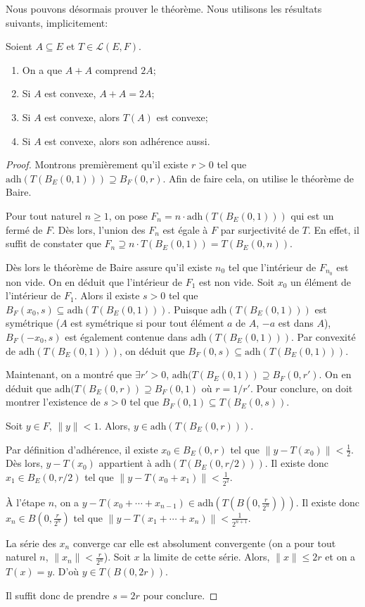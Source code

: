 Nous pouvons désormais prouver le théorème. Nous utilisons les résultats
suivants, implicitement:
\begin{exo}
  Soient $A\subseteq E$ et $T\in\mathscr{L}(E, F)$.
  \begin{enumerate}
  \item On a que $A + A$ comprend $2A$;
  \item Si $A$ est convexe, $A+A = 2A$;
  \item Si $A$ est convexe, alors $T(A)$ est convexe;
  \item Si $A$ est convexe, alors son adhérence aussi.
  \end{enumerate}
\end{exo}
\begin{proof}
  Montrons premièrement qu'il existe $r>0$ tel que $\mathrm{adh}(T(B_E(0, 1)))%
  \supseteq B_F(0, r)$. Afin de faire cela, on utilise le théorème de Baire.

  Pour tout naturel $n\geq 1$, on pose $F_n = n\cdot\mathrm{adh}(T(B_E(0, 1)))$
  qui est un fermé de $F$. Dès lors, l'union des $F_n$ est égale à $F$
  par surjectivité de $T$. En effet, il suffit de constater que
  $F_n\supseteq n\cdot T(B_E(0, 1)) =T(B_E(0, n))$.

  Dès lors le théorème de Baire assure qu'il existe $n_0$ tel que
  l'intérieur de $F_{n_0}$ est non vide. On en déduit que l'intérieur
  de $F_1$ est non vide. Soit $x_0$ un élément de l'intérieur de $F_1$.
  Alors il existe $s>0$ tel que
  $B_F(x_0, s)\subseteq  \mathrm{adh}(T(B_E(0, 1)))$. Puisque
  $\mathrm{adh}(T(B_E(0, 1)))$ est symétrique ($A$ est symétrique
  si pour tout élément $a$ de $A$, $-a$ est dans $A$), $B_F(-x_0, s)$
  est également contenue dans $\mathrm{adh}(T(B_E(0, 1)))$. Par convexité
  de $\mathrm{adh}(T(B_E(0, 1)))$, on déduit que
  $B_F(0, s)\subseteq \mathrm{adh}(T(B_E(0, 1)))$.

  Maintenant, on a montré que $\exists r' > 0$, $\mathrm{adh}(T(B_E(0, 1))%
  \supseteq B_F(0, r')$. On en déduit que $\mathrm{adh}(T(B_E(0, r))%
  \supseteq B_F(0, 1)$ où $r= 1/r'$. Pour conclure, on doit montrer l'existence
  de $s>0$ tel que $B_F(0, 1)\subseteq T(B_E(0, s))$.

  Soit $y\in F$, $\|y\| < 1$. Alors, $y\in\mathrm{adh}(T(B_E(0, r)))$.

  Par définition d'adhérence, il existe $x_0\in B_E(0, r)$ tel que
  $\|y-T(x_0)\| < \frac{1}{2}$. Dès lors, $y-T(x_0)$ appartient
  à $\mathrm{adh}(T(B_E(0, r/2)))$. Il existe donc
  $x_1\in B_E(0, r/2)$ tel que $\|y-T(x_0 + x_1)\| < \frac{1}{2^2}$.

  \`{A} l'étape $n$, on a $y - T(x_0 + \cdots + x_{n-1})\in%
  \mathrm{adh}(T(B(0, \frac{r}{2^n})))$. Il existe donc
  $x_n\in B(0, \frac{r}{2 ^{n}})$ tel que
  $\|y - T(x_1 + \cdots + x_n)\| < \frac{1}{2^{n+1}}$.

  La série des $x_n$ converge car elle est absolument convergente (on a
  pour tout naturel $n$, $\|x_n\|<\frac{r}{2^{n}}$). Soit $x$ la limite
  de cette série. Alors, $\|x\|\leq 2r$ et on a $T(x) = y$.
  D'où $y\in T(B(0, 2r))$.

  Il suffit donc de prendre $s = 2r$ pour conclure.
\end{proof}
